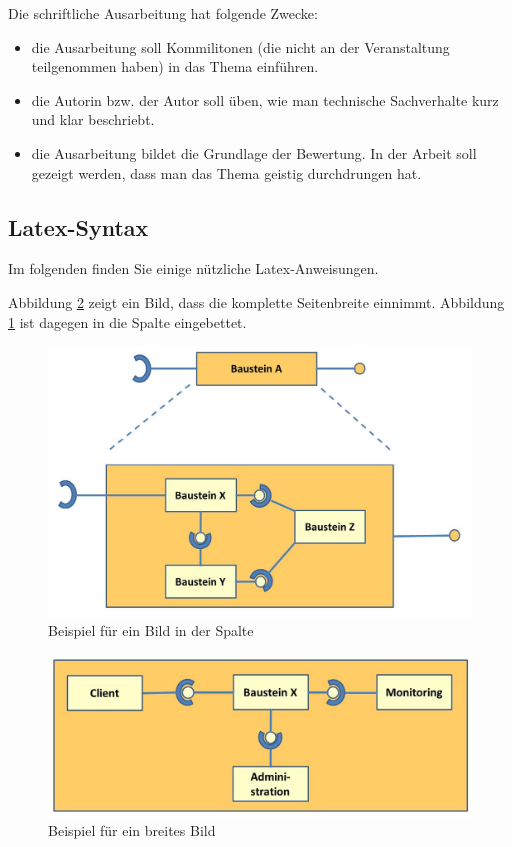 \documentclass[fleqn,10pt,ngerman]{SelfArx}
\begin{document}
Die schriftliche Ausarbeitung hat folgende Zwecke:
\begin{itemize}[noitemsep]
\item die Ausarbeitung soll Kommilitonen (die nicht an der Veranstaltung teilgenommen haben) in das Thema ein\-führen.
\item die Autorin bzw. der Autor soll üben, wie man technische Sachverhalte kurz und klar beschriebt.
\item die Ausarbeitung bildet die Grundlage der Bewertung. In der Arbeit soll
gezeigt werden, dass man das Thema geistig durchdrungen hat.
\end{itemize}


\subsection{Latex-Syntax}
Im folgenden finden Sie einige nützliche Latex-Anweisungen.

Abbildung \ref{fig:MultiInterfaces} zeigt ein Bild, dass die komplette Seitenbreite einnimmt. Abbildung \ref{fig:Baustein} ist dagegen in die Spalte eingebettet.


\begin{figure}[ht]\centering
	\includegraphics[width=5 cm]{Abbildungen/Baustein}
	\caption{Beispiel für ein Bild in der Spalte}
	\label{fig:Baustein}
\end{figure}

\begin{figure}[ht]\centering %
	\includegraphics[width=\linewidth]{Abbildungen/BausteinMultiInterfaces}
	\caption{Beispiel für ein breites Bild}
	\label{fig:MultiInterfaces}
\end{figure}
\end{document}
